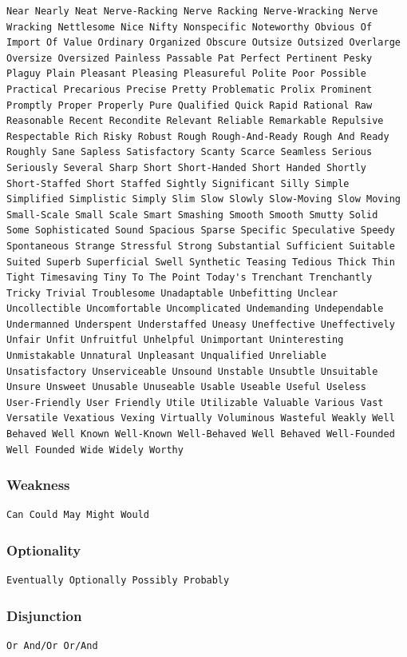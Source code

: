 \documentclass[12pt]{report}
\begin{document}
\begin{lstlisting}
Near Nearly Neat Nerve-Racking Nerve Racking Nerve-Wracking Nerve
Wracking Nettlesome Nice Nifty Nonspecific Noteworthy Obvious Of
Import Of Value Ordinary Organized Obscure Outsize Outsized Overlarge
Oversize Oversized Painless Passable Pat Perfect Pertinent Pesky
Plaguy Plain Pleasant Pleasing Pleasureful Polite Poor Possible
Practical Precarious Precise Pretty Problematic Prolix Prominent
Promptly Proper Properly Pure Qualified Quick Rapid Rational Raw
Reasonable Recent Recondite Relevant Reliable Remarkable Repulsive
Respectable Rich Risky Robust Rough Rough-And-Ready Rough And Ready
Roughly Sane Sapless Satisfactory Scanty Scarce Seamless Serious
Seriously Several Sharp Short Short-Handed Short Handed Shortly
Short-Staffed Short Staffed Sightly Significant Silly Simple
Simplified Simplistic Simply Slim Slow Slowly Slow-Moving Slow Moving
Small-Scale Small Scale Smart Smashing Smooth Smooth Smutty Solid
Some Sophisticated Sound Spacious Sparse Specific Speculative Speedy
Spontaneous Strange Stressful Strong Substantial Sufficient Suitable
Suited Superb Superficial Swell Synthetic Teasing Tedious Thick Thin
Tight Timesaving Tiny To The Point Today's Trenchant Trenchantly
Tricky Trivial Troublesome Unadaptable Unbefitting Unclear
Uncollectible Uncomfortable Uncomplicated Undemanding Undependable
Undermanned Underspent Understaffed Uneasy Uneffective Uneffectively
Unfair Unfit Unfruitful Unhelpful Unimportant Uninteresting
Unmistakable Unnatural Unpleasant Unqualified Unreliable
Unsatisfactory Unserviceable Unsound Unstable Unsubtle Unsuitable
Unsure Unsweet Unusable Unuseable Usable Useable Useful Useless
User-Friendly User Friendly Utile Utilizable Valuable Various Vast
Versatile Vexatious Vexing Virtually Voluminous Wasteful Weakly Well
Behaved Well Known Well-Known Well-Behaved Well Behaved Well-Founded
Well Founded Wide Widely Worthy
\end{lstlisting}


\subsubsection{Weakness}
\begin{lstlisting}
Can Could May Might Would
\end{lstlisting}


\subsubsection{Optionality}
\begin{lstlisting}
Eventually Optionally Possibly Probably
\end{lstlisting}


\subsubsection{Disjunction}
\begin{lstlisting}
Or And/Or Or/And
\end{lstlisting}


\clearpage\thispagestyle{empty}
\null\newpage


\nocite{*}
\printbibliography
\end{document}
